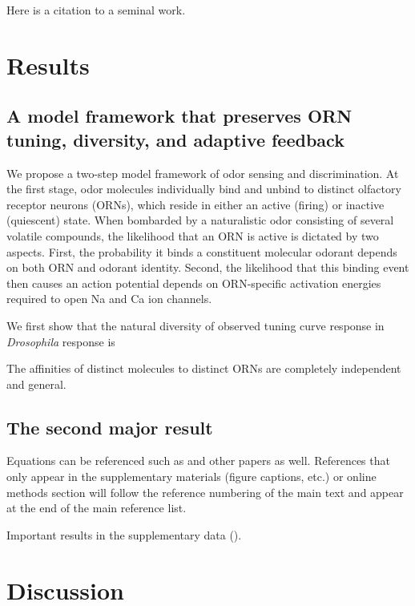 
Here is a citation to a seminal work\cite{OKeeNade78a}. \lipsum[2-3]

\section*{Results}

\subsection*{A model framework that preserves ORN tuning, diversity, and adaptive feedback}

We propose a two-step model framework of odor sensing and discrimination. At the first stage, odor molecules individually bind and unbind to distinct olfactory receptor neurons (ORNs), which reside in either an active (firing) or inactive (quiescent) state. When bombarded by a naturalistic odor consisting of several volatile compounds, the likelihood that an ORN is active is dictated by two aspects. First, the probability it binds a constituent molecular odorant depends on both ORN and odorant identity. Second, the likelihood that this binding event then causes an action potential depends on ORN-specific activation energies required to open Na and Ca ion channels. 

We first show that the natural diversity of observed tuning curve response in \textit{Drosophila} response is 




The affinities of distinct molecules to distinct ORNs are completely independent and general. 

\subsection*{}




\subsection*{The second major result}

Equations can be referenced such as  and other papers as well\cite{Hill78a}. References
that only appear in the supplementary materials (figure captions, etc.) or online methods section
will follow the reference numbering of the main text and appear at the end of the main reference
list. \lipsum[5]

Important results in the supplementary data (). \lipsum[6]

\section*{Discussion}

\lipsum[7-9]

